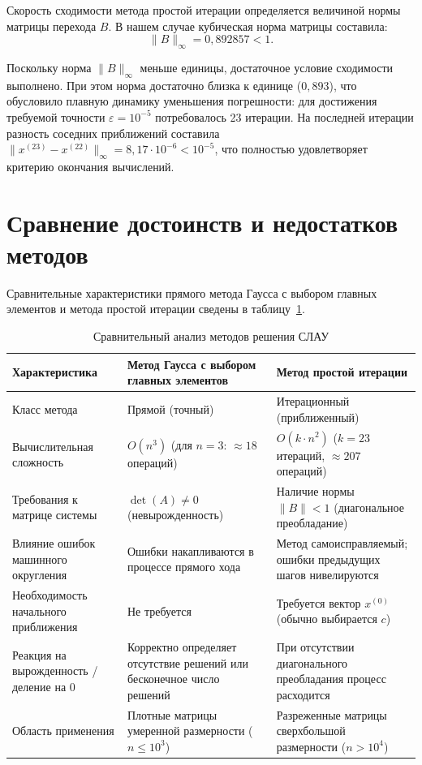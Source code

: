 Скорость сходимости метода простой итерации определяется величиной нормы матрицы перехода $B$. В нашем случае кубическая норма матрицы составила:
\begin{equation}
    \|B\|_\infty = 0{,}892857 < 1.
\end{equation}

Поскольку норма $\|B\|_\infty$ меньше единицы, достаточное условие сходимости выполнено. При этом норма достаточно близка к единице ($0{,}893$), что обусловило плавную динамику уменьшения погрешности: для достижения требуемой точности $\varepsilon = 10^{-5}$ потребовалось 23 итерации. На последней итерации разность соседних приближений составила $\|x^{(23)} - x^{(22)}\|_\infty = 8{,}17 \cdot 10^{-6} < 10^{-5}$, что полностью удовлетворяет критерию окончания вычислений.

\section{Сравнение достоинств и недостатков методов}

Сравнительные характеристики прямого метода Гаусса с выбором главных элементов и метода простой итерации сведены в таблицу~\ref{tab:comparison}.

\begin{table}[H]
    \caption{Сравнительный анализ методов решения СЛАУ}
    \label{tab:comparison}
    \centering
    \small
    \begin{tabular}{|p{3.6cm}|p{5.4cm}|p{5.4cm}|}
        \hline
        \textbf{Характеристика} & \textbf{Метод Гаусса с выбором главных элементов} & \textbf{Метод простой итерации} \\
        \hline
        Класс метода & Прямой (точный) & Итерационный (приближенный) \\
        \hline
        Вычислительная сложность & $O(n^3)$ (для $n=3$: $\approx 18$ операций) & $O(k \cdot n^2)$ ($k=23$ итераций, $\approx 207$ операций) \\
        \hline
        Требования к матрице системы & $\det(A) \neq 0$ (невырожденность) & Наличие нормы $\|B\| < 1$ (диагональное преобладание) \\
        \hline
        Влияние ошибок машинного округления & Ошибки накапливаются в процессе прямого хода & Метод самоисправляемый; ошибки предыдущих шагов нивелируются \\
        \hline
        Необходимость начального приближения & Не требуется & Требуется вектор $x^{(0)}$ (обычно выбирается $c$) \\
        \hline
        Реакция на вырожденность / деление на 0 & Корректно определяет отсутствие решений или бесконечное число решений & При отсутствии диагонального преобладания процесс расходится \\
        \hline
        Область применения & Плотные матрицы умеренной размерности ($n \le 10^3$) & Разреженные матрицы сверхбольшой размерности ($n > 10^4$) \\
        \hline
    \end{tabular}
\end{table}

